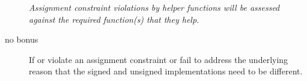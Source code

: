 \begin{description}
    \item[] \textit{Assignment constraint violations by helper functions will be assessed against the required function(s) that they help.}
    \item[no bonus] If  or  violate an assignment constraint or fail to address the underlying reason that the signed and unsigned implementations need to be different.
\end{description}